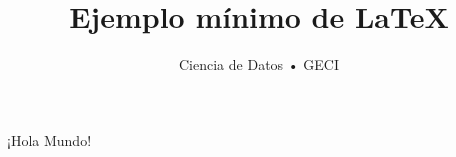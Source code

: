 \documentclass{article}
\begin{document}
\title{Ejemplo mínimo de \LaTeX}
\author{Ciencia de Datos • GECI}
\maketitle

¡Hola Mundo!

\end{document}
